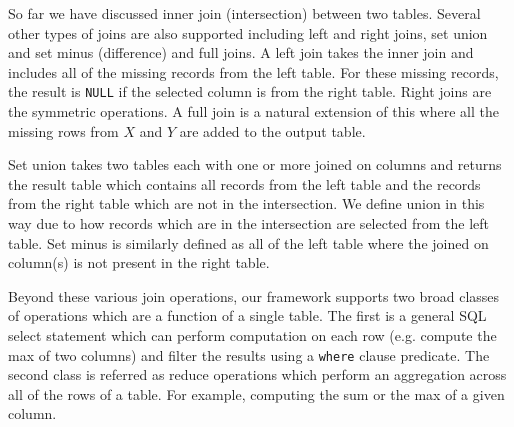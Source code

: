So far we have discussed inner join (intersection) between two tables. Several other types of joins are also supported including left and right joins, set union and set minus (difference) and full joins. A left join takes the inner join and includes all of the missing records from the left table. For these missing records, the result is \texttt{NULL} if the selected column is from the right table. Right joins are the symmetric operations. A full join is a natural extension of this where all the missing rows from $X$ and $Y$ are added to the output table.

Set union takes two tables each with one or more joined on columns and returns the result table which contains all records from the left table and the records from the right table which are not in the intersection. We define union in this way due to how records which are in the intersection are selected from the left table. Set minus is similarly defined as all of the left table where the joined on column(s) is not present in the right table. 

Beyond these various join operations, our framework supports two broad classes of operations which are a function of a single table. The first is a general SQL select statement which can perform computation on each row (e.g. compute the max of two columns) and filter the results using a \texttt{where} clause predicate. The second class is referred as reduce operations which perform an aggregation across all of the rows of a table. For example, computing the sum or the max of a given column. 


